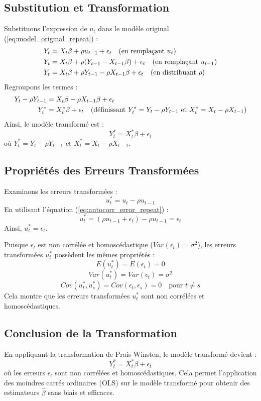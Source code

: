 \documentclass[14pt]{extarticle} %
\theoremstyle{definition}
\theoremstyle{plain}
\begin{document}
\subsection{Substitution et Transformation}
Substituons l'expression de \( u_t \) dans le modèle original (\ref{eq:model_original_repeat}) :
\begin{align*}
Y_t &= X_t \beta + \rho u_{t-1} + \epsilon_t \quad \text{(en remplaçant \( u_t \))} \\
Y_t &= X_t \beta + \rho (Y_{t-1} - X_{t-1} \beta) + \epsilon_t \quad \text{(en remplaçant \( u_{t-1} \))} \\
Y_t &= X_t \beta + \rho Y_{t-1} - \rho X_{t-1} \beta + \epsilon_t \quad \text{(en distribuant \( \rho \))}
\end{align*}
Regroupons les termes :
\begin{align*}
Y_t - \rho Y_{t-1} &= X_t \beta - \rho X_{t-1} \beta + \epsilon_t \\
Y_t^* &= X_t^* \beta + \epsilon_t \quad \text{(définissant \( Y_t^* = Y_t - \rho Y_{t-1} \) et \( X_t^* = X_t - \rho X_{t-1} \))}
\end{align*}
Ainsi, le modèle transformé est :
\[
Y_t^* = X_t^* \beta + \epsilon_t
\]
où \( Y_t^* = Y_t - \rho Y_{t-1} \) et \( X_t^* = X_t - \rho X_{t-1} \).

\subsection{Propriétés des Erreurs Transformées}
Examinons les erreurs transformées :
\[
u_t^* = u_t - \rho u_{t-1}
\]
En utilisant l'équation (\ref{eq:autocorr_error_repeat}) :
\[
u_t^* = (\rho u_{t-1} + \epsilon_t) - \rho u_{t-1} = \epsilon_t
\]
Ainsi, \( u_t^* = \epsilon_t \).

Puisque \( \epsilon_t \) est non corrélée et homoscédastique (\( Var(\epsilon_t) = \sigma^2 \)), les erreurs transformées \( u_t^* \) possèdent les mêmes propriétés :
\[
E(u_t^*) = E(\epsilon_t) = 0
\]
\[
Var(u_t^*) = Var(\epsilon_t) = \sigma^2
\]
\[
Cov(u_t^*, u_s^*) = Cov(\epsilon_t, \epsilon_s) = 0 \quad \text{pour } t \neq s
\]
Cela montre que les erreurs transformées \( u_t^* \) sont non corrélées et homoscédastiques.

\subsection{Conclusion de la Transformation}
En appliquant la transformation de Prais-Winsten, le modèle transformé devient :
\[
Y_t^* = X_t^* \beta + \epsilon_t
\]
où les erreurs \( \epsilon_t \) sont non corrélées et homoscédastiques. Cela permet l'application des moindres carrés ordinaires (OLS) sur le modèle transformé pour obtenir des estimateurs \( \hat{\beta} \) sans biais et efficaces.
\end{document}
